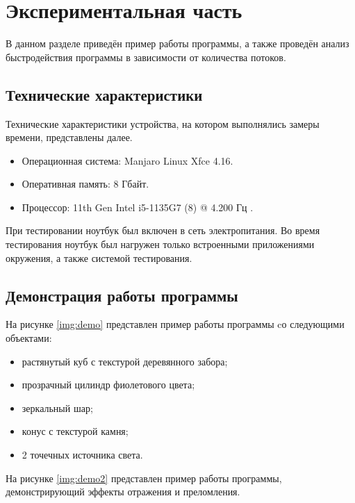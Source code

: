 \chapter{Экспериментальная часть}

В данном разделе приведён пример работы программы, а также проведён анализ быстродействия программы в зависимости от количества потоков. 

\section{Технические характеристики}

Технические характеристики устройства, на котором выполнялись замеры времени, представлены далее.

\begin{itemize}[label=---]
	\item Операционная система: Manjaro Linux  Xfce 4.16.
	\item Оперативная память: 8 Гбайт.
	\item Процессор: 11th Gen Intel i5-1135G7 (8) @ 4.200 Гц \cite{intel}.
\end{itemize}

При тестировании ноутбук был включен в сеть электропитания. Во время тестирования ноутбук был нагружен только встроенными приложениями окружения, а также системой тестирования.

\section{Демонстрация работы программы}

На рисунке \ref{img:demo} представлен пример работы программы cо следующими объектами:

\begin{itemize}[label=---]
	\item растянутый куб с текстурой деревянного забора;
	\item прозрачный цилиндр фиолетового цвета;
	\item зеркальный шар;
	\item конус с текстурой камня;
	\item 2 точечных источника света.
\end{itemize}

\clearpage


На рисунке \ref{img:demo2} представлен пример работы программы, демонстрирующий эффекты отражения и преломления.

